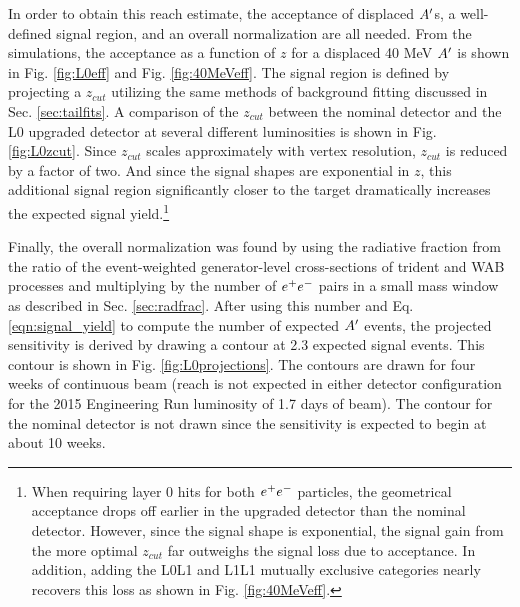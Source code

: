 In order to obtain this reach estimate, the acceptance of displaced $A^\prime$s, a well-defined signal region, and an overall normalization are all needed. From the simulations, the acceptance as a function of $z$ for a displaced 40 MeV $A^\prime$ is shown in Fig. \ref{fig:L0eff} and Fig. \ref{fig:40MeVeff}. The signal region is defined by projecting a $z_{cut}$ utilizing the same methods of background fitting discussed in Sec. \ref{sec:tailfits}. A comparison of the $z_{cut}$ between the nominal detector and the L0 upgraded detector at several different luminosities is shown in Fig. \ref{fig:L0zcut}. Since $z_{cut}$ scales approximately with vertex resolution, $z_{cut}$ is reduced by a factor of two. And since the signal shapes are exponential in $z$, this additional signal region significantly closer to the target dramatically increases the expected signal yield.\footnote{When requiring layer 0 hits for both $e^{+}e^{-}$ particles, the geometrical acceptance drops off earlier in the upgraded detector than the nominal detector. However, since the signal shape is exponential, the signal gain from the more optimal $z_{cut}$ far outweighs the signal loss due to acceptance. In addition, adding the L0L1 and L1L1 mutually exclusive categories nearly recovers this loss as shown in Fig. \ref{fig:40MeVeff}.}

Finally, the overall normalization was found by using the radiative fraction from the ratio of the event-weighted generator-level cross-sections of trident and WAB processes and multiplying by the number of $e^{+}e^{-}$ pairs in a small mass window as described in Sec. \ref{sec:radfrac}. After using this number and Eq. \ref{eqn:signal_yield} to compute the number of expected $A^\prime$ events, the projected sensitivity is derived by drawing a contour at 2.3 expected signal events. This contour is shown in Fig. \ref{fig:L0projections}. The contours are drawn for four weeks of continuous beam (reach is not expected in either detector configuration for the 2015 Engineering Run luminosity of 1.7 days of beam). The contour for the nominal detector is not drawn since the sensitivity is expected to begin at about 10 weeks.


